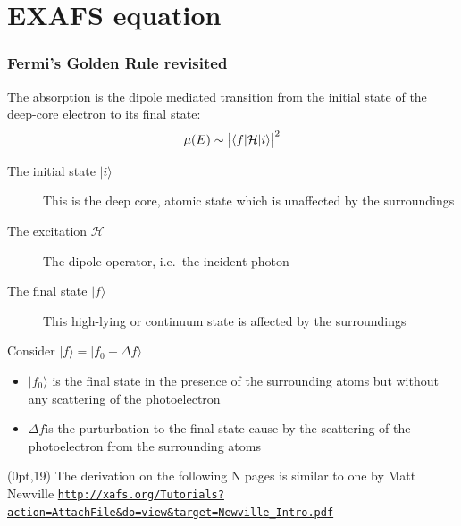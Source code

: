 \documentclass[10pt, xcolor=x11names, compress]{beamer}
\begin{document}

\section{EXAFS equation}


\begin{frame}
  \frametitle{Fermi's Golden Rule revisited}
  The absorption is the dipole mediated transition from the initial
  state of the deep-core electron to its final state:
  \begin{equation}
    \mu(E) \sim \big|\langle f| \mathcal{H}|i\rangle\big|^2
    \notag
  \end{equation}
  \begin{description}
  \item[The initial state $|i\rangle$] This is the deep core, atomic
    state which is unaffected by the surroundings
  \item[The excitation $\mathcal{H}$] The dipole operator, i.e.\ the
    incident photon
  \item[The final state $|f\rangle$] This high-lying or continuum
    state \alert{is} affected by the surroundings
  \end{description}
  \begin{block}{Consider $|f\rangle = |f_0+\Delta f\rangle$}
    \begin{itemize}
    \item $|f_0\rangle$ is the final state in the presence of the
      surrounding atoms but \alert{without} any scattering of the
      photoelectron
    \item $\Delta f$is the purturbation to the final state cause by
      the scattering of the photoelectron from the surrounding atoms
    \end{itemize}
  \end{block}
  \begin{textblock*}{0.6\linewidth}(0pt,19\TPVertModule)%
    \tiny%
    The derivation on the following N pages is similar to one by Matt
    Newville
    \href{http://xafs.org/Tutorials?action=AttachFile&do=view&target=Newville_Intro.pdf}
    {\color{Blue4}\texttt{http://xafs.org/Tutorials?action=AttachFile\&do=view\&target=Newville\_Intro.pdf}}
  \end{textblock*}
\end{frame}
\end{document}
